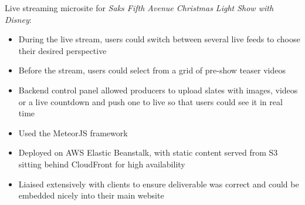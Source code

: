 \item Live streaming microsite for \emph{Saks Fifth Avenue Christmas Light Show with Disney}:
\begin{itemize}%
    \item During the live stream, users could switch between several live feeds to choose their desired perspective
    \item Before the stream, users could select from a grid of pre-show teaser videos
    \item Backend control panel allowed producers to upload slates with images, videos or a live countdown and push one to live so that users could see it in real time
    \item Used the MeteorJS framework
    \item Deployed on AWS Elastic Beanstalk, with static content served from S3 sitting behind CloudFront for high availability
    \item Liaised extensively with clients to ensure deliverable was correct and could be embedded nicely into their main website
\end{itemize}
